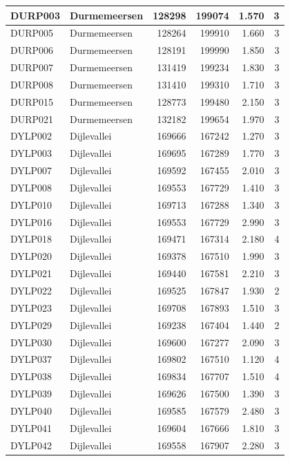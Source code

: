 \documentclass[11pt,]{book}
\begin{document}
\begin{table}
\begin{tabular}[t]{l|l|r|r|r|r}
\hline
DURP003 & Durmemeersen & 128298 & 199074 & 1.570 & 3\\
\hline
DURP005 & Durmemeersen & 128264 & 199910 & 1.660 & 3\\
\hline
DURP006 & Durmemeersen & 128191 & 199990 & 1.850 & 3\\
\hline
DURP007 & Durmemeersen & 131419 & 199234 & 1.830 & 3\\
\hline
DURP008 & Durmemeersen & 131410 & 199310 & 1.710 & 3\\
\hline
DURP015 & Durmemeersen & 128773 & 199480 & 2.150 & 3\\
\hline
DURP021 & Durmemeersen & 132182 & 199654 & 1.970 & 3\\
\hline
DYLP002 & Dijlevallei & 169666 & 167242 & 1.270 & 3\\
\hline
DYLP003 & Dijlevallei & 169695 & 167289 & 1.770 & 3\\
\hline
DYLP007 & Dijlevallei & 169592 & 167455 & 2.010 & 3\\
\hline
DYLP008 & Dijlevallei & 169553 & 167729 & 1.410 & 3\\
\hline
DYLP010 & Dijlevallei & 169713 & 167288 & 1.340 & 3\\
\hline
DYLP016 & Dijlevallei & 169553 & 167729 & 2.990 & 3\\
\hline
DYLP018 & Dijlevallei & 169471 & 167314 & 2.180 & 4\\
\hline
DYLP020 & Dijlevallei & 169378 & 167510 & 1.990 & 3\\
\hline
DYLP021 & Dijlevallei & 169440 & 167581 & 2.210 & 3\\
\hline
DYLP022 & Dijlevallei & 169525 & 167847 & 1.930 & 2\\
\hline
DYLP023 & Dijlevallei & 169708 & 167893 & 1.510 & 3\\
\hline
DYLP029 & Dijlevallei & 169238 & 167404 & 1.440 & 2\\
\hline
DYLP030 & Dijlevallei & 169600 & 167277 & 2.090 & 3\\
\hline
DYLP037 & Dijlevallei & 169802 & 167510 & 1.120 & 4\\
\hline
DYLP038 & Dijlevallei & 169834 & 167707 & 1.510 & 4\\
\hline
DYLP039 & Dijlevallei & 169626 & 167500 & 1.390 & 3\\
\hline
DYLP040 & Dijlevallei & 169585 & 167579 & 2.480 & 3\\
\hline
DYLP041 & Dijlevallei & 169604 & 167666 & 1.810 & 3\\
\hline
DYLP042 & Dijlevallei & 169558 & 167907 & 2.280 & 3\\

\end{tabular}
\end{table}
\end{document}
